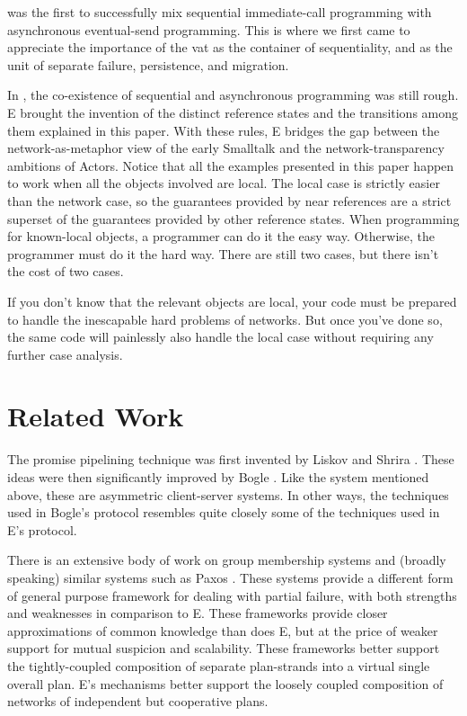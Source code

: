 \documentclass{llncs}
\begin{document}
 was the first to successfully mix sequential
immediate-call programming with asynchronous eventual-send
programming. This is where we first came to appreciate the importance
of the vat as the container of sequentiality, and as the unit of
separate failure, persistence, and migration. 

 In , the
co-existence of sequential and asynchronous programming was still
rough. E brought the invention of the distinct reference states and
the transitions among them explained in this paper. With these rules,
E bridges the gap between the network-as-metaphor view of the early
Smalltalk and the network-transparency ambitions of Actors. Notice
that all the examples presented in this paper happen to work when all
the objects involved are local. The local case is strictly easier than
the network case, so the guarantees provided by near references are a
strict superset of the guarantees provided by other reference
states. When programming for known-local objects, a programmer can do
it the easy way. Otherwise, the programmer must do it the hard
way. There are still two cases, but there isn't the cost of two cases.

If you don't know that the relevant objects are local, your code must
be prepared to handle the inescapable hard problems of networks. But
once you've done so, the same code will painlessly also handle the
local case without requiring any further case analysis.

\section{Related Work}

 The promise
pipelining technique was first invented by Liskov and Shrira
\cite{liskov:promises}. These ideas were then significantly improved
by Bogle \cite{bogle:batched}. Like the  system
mentioned above, these are asymmetric client-server systems. In other
ways, the techniques used in Bogle's protocol resembles quite closely
some of the techniques used in E's protocol.

 There is an extensive body of work
on group membership systems \cite{birman:vsync,amir:thesis} and
(broadly speaking) similar systems such as Paxos
\cite{lamport:paxos}. These systems provide a different form of
general purpose framework for dealing with partial failure, with both
strengths and weaknesses in comparison to E. These frameworks provide
closer approximations of common knowledge than does E, but at the
price of weaker support for mutual suspicion and scalability. These
frameworks better support the tightly-coupled composition of separate
plan-strands into a virtual single overall plan. E's mechanisms better
support the loosely coupled composition of networks of independent but
cooperative plans.
\end{document}
